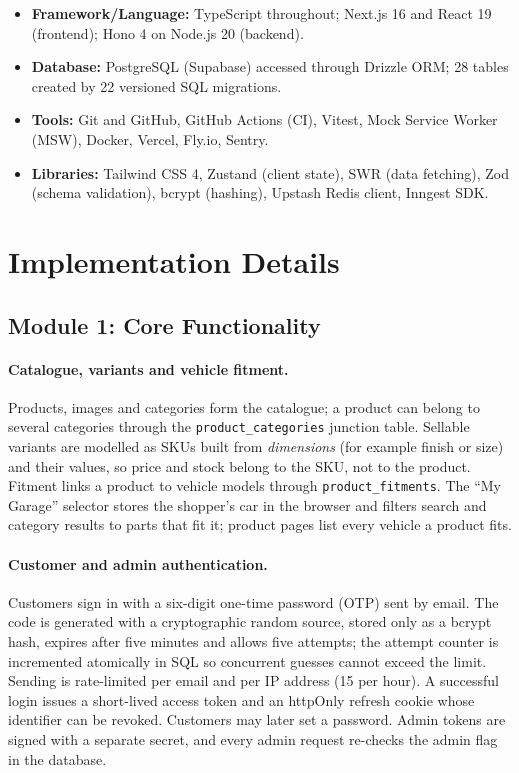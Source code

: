 \documentclass{tietreport}
\begin{document}
\begin{itemize}
  \item \textbf{Framework/Language:} TypeScript throughout; Next.js 16 and
        React 19 (frontend); Hono 4 on Node.js 20 (backend).
  \item \textbf{Database:} PostgreSQL (Supabase) accessed through Drizzle ORM;
        28 tables created by 22 versioned SQL migrations.
  \item \textbf{Tools:} Git and GitHub, GitHub Actions (CI), Vitest, Mock
        Service Worker (MSW), Docker, Vercel, Fly.io, Sentry.
  \item \textbf{Libraries:} Tailwind CSS 4, Zustand (client state), SWR
        (data fetching), Zod (schema validation), bcrypt (hashing), Upstash
        Redis client, Inngest SDK.
\end{itemize}

\section{Implementation Details}

\subsection{Module 1: Core Functionality}

\paragraph{Catalogue, variants and vehicle fitment.}
Products, images and categories form the catalogue; a product can belong to
several categories through the \texttt{product\_categories} junction table.
Sellable variants are modelled as SKUs built from \emph{dimensions} (for
example finish or size) and their values, so price and stock belong to the
SKU, not to the product. Fitment links a product to vehicle models through
\texttt{product\_fitments}. The ``My Garage'' selector stores the shopper's
car in the browser and filters search and category results to parts that fit
it; product pages list every vehicle a product fits.

\paragraph{Customer and admin authentication.}
Customers sign in with a six-digit one-time password (OTP) sent by email.
The code is generated with a cryptographic random source, stored only as a
bcrypt hash, expires after five minutes and allows five attempts; the
attempt counter is incremented atomically in SQL so concurrent guesses
cannot exceed the limit. Sending is rate-limited per email and per IP
address (15 per hour). A successful login issues a short-lived access token
and an httpOnly refresh cookie whose identifier can be revoked. Customers may
later set a password. Admin tokens are signed with a separate secret, and
every admin request re-checks the admin flag in the database.
\end{document}
